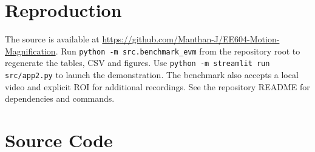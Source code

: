 \documentclass[10pt,twocolumn,letterpaper]{article}
\newcommand{\codefile}[1]{}
\begin{document}
\clearpage

\appendix
\section{Reproduction}
The source is available at
\url{https://github.com/Manthan-J/EE604-Motion-Magnification}.
Run \texttt{python -m src.benchmark\_evm} from the repository root to regenerate
the tables, CSV and figures. Use \texttt{python -m streamlit run src/app2.py}
to launch the demonstration. The benchmark also accepts a local video
and explicit ROI for additional recordings. See the repository README
for dependencies and commands.

\section{Source Code}
\codefile{src/spatial.py}
\codefile{src/auto_frequency.py}
\codefile{src/auto_roi.py}
\codefile{src/roi_magnification.py}
\codefile{src/app2.py}
\codefile{src/benchmark_evm.py}
\end{document}
